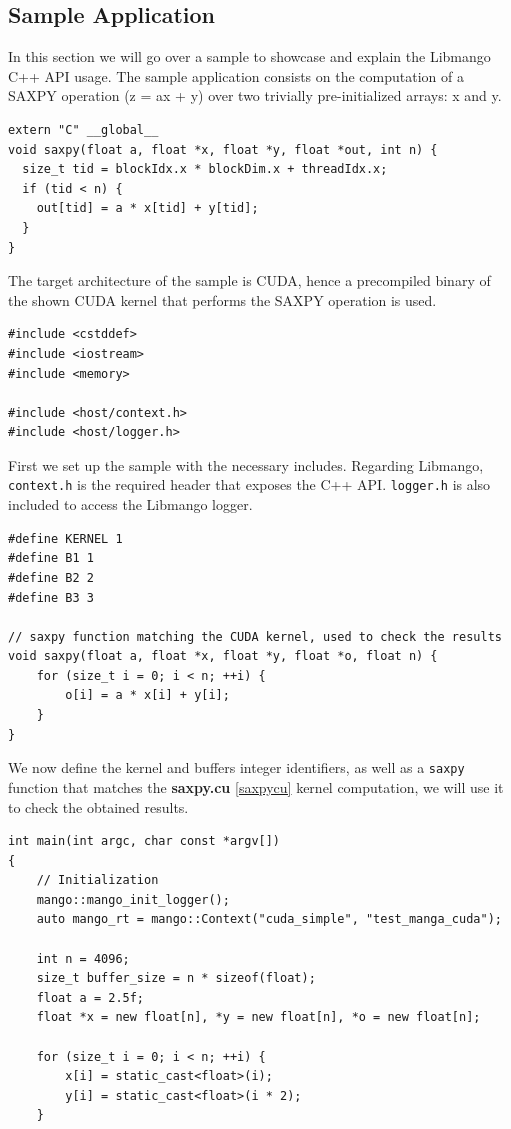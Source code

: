 \subsection{Sample Application}

In this section we will go over a sample to showcase and explain the Libmango C++ API usage. The sample application consists on the computation of a SAXPY operation (z = ax + y) over two trivially pre-initialized arrays: x and y. 

\begin{lstlisting}[style=CStyle, label=saxpycu, caption=saxpy.cu]
extern "C" __global__ 
void saxpy(float a, float *x, float *y, float *out, int n) {
  size_t tid = blockIdx.x * blockDim.x + threadIdx.x;
  if (tid < n) {
    out[tid] = a * x[tid] + y[tid];
  }
}
\end{lstlisting}

The target architecture of the sample is CUDA, hence a precompiled binary of the shown CUDA kernel that performs the SAXPY operation is used.

\begin{lstlisting}[style=CStyle, caption=Sample - Includes]
#include <cstddef>
#include <iostream>
#include <memory>

#include <host/context.h>
#include <host/logger.h>
\end{lstlisting}

First we set up the sample with the necessary includes. Regarding Libmango, \texttt{context.h} is the required header that exposes the C++ API. \texttt{logger.h} is also included to access the Libmango logger.

\begin{lstlisting}[style=CStyle, caption=Sample - Definitions]
#define KERNEL 1
#define B1 1
#define B2 2
#define B3 3

// saxpy function matching the CUDA kernel, used to check the results
void saxpy(float a, float *x, float *y, float *o, float n) {
    for (size_t i = 0; i < n; ++i) {
        o[i] = a * x[i] + y[i];
    }
}
\end{lstlisting}

We now define the kernel and buffers integer identifiers, as well as a \texttt{saxpy} function that matches the \textbf{saxpy.cu} \ref{saxpycu} kernel computation, we will use it to check the obtained results.

\begin{lstlisting}[style=CStyle, caption=Sample - Initialization]
int main(int argc, char const *argv[])
{
    // Initialization
    mango::mango_init_logger();
    auto mango_rt = mango::Context("cuda_simple", "test_manga_cuda");

    int n = 4096;
    size_t buffer_size = n * sizeof(float);
    float a = 2.5f;
    float *x = new float[n], *y = new float[n], *o = new float[n];

    for (size_t i = 0; i < n; ++i) {
        x[i] = static_cast<float>(i);
        y[i] = static_cast<float>(i * 2);
    }
\end{lstlisting}

